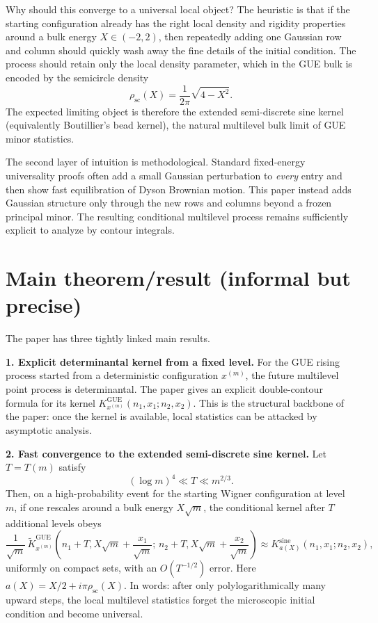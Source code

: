 \documentclass[11pt]{article}
\begin{document}
Why should this converge to a universal local object? The heuristic is that if the starting configuration already has the right local density and rigidity properties around a bulk energy $X\in(-2,2)$, then repeatedly adding one Gaussian row and column should quickly wash away the fine details of the initial condition. The process should retain only the local density parameter, which in the GUE bulk is encoded by the semicircle density
\[
\rho_{\mathrm{sc}}(X)=\frac{1}{2\pi}\sqrt{4-X^2}.
\]
The expected limiting object is therefore the extended semi-discrete sine kernel (equivalently Boutillier's bead kernel), the natural multilevel bulk limit of GUE minor statistics.

The second layer of intuition is methodological. Standard fixed-energy universality proofs often add a small Gaussian perturbation to \emph{every} entry and then show fast equilibration of Dyson Brownian motion. This paper instead adds Gaussian structure only through the new rows and columns beyond a frozen principal minor. The resulting conditional multilevel process remains sufficiently explicit to analyze by contour integrals.

\section*{Main theorem/result (informal but precise)}
The paper has three tightly linked main results.

\textbf{1. Explicit determinantal kernel from a fixed level.} For the GUE rising process started from a deterministic configuration $x^{(m)}$, the future multilevel point process is determinantal. The paper gives an explicit double-contour formula for its kernel $K^{\mathrm{GUE}}_{x^{(m)}}(n_1,x_1;n_2,x_2)$. This is the structural backbone of the paper: once the kernel is available, local statistics can be attacked by asymptotic analysis.

\textbf{2. Fast convergence to the extended semi-discrete sine kernel.} Let $T=T(m)$ satisfy
\[
(\log m)^4 \ll T \ll m^{2/3}.
\]
Then, on a high-probability event for the starting Wigner configuration at level $m$, if one rescales around a bulk energy $X\sqrt m$, the conditional kernel after $T$ additional levels obeys
\[
\frac{1}{\sqrt m}\,\widetilde K^{\mathrm{GUE}}_{x^{(m)}}\!\left(n_1+T, X\sqrt m+\frac{x_1}{\sqrt m};\, n_2+T, X\sqrt m+\frac{x_2}{\sqrt m}\right)
\approx K^{\mathrm{sine}}_{a(X)}(n_1,x_1;n_2,x_2),
\]
uniformly on compact sets, with an $O(T^{-1/2})$ error. Here $a(X)=X/2+i\pi\rho_{\mathrm{sc}}(X)$. In words: after only polylogarithmically many upward steps, the local multilevel statistics forget the microscopic initial condition and become universal.
\end{document}
